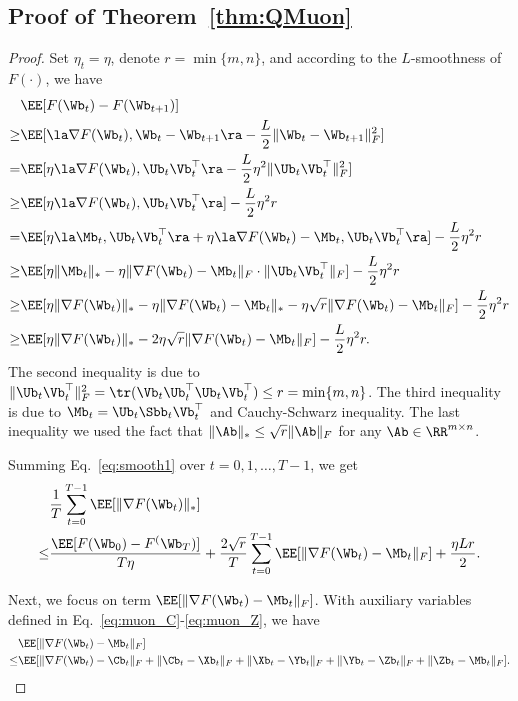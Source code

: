 \documentclass[11pt, letterpaper]{article}
\begin{document}
\subsection{Proof of Theorem~\ref{thm:QMuon}}
\begin{proof}
Set $\eta_t = \eta$, denote $r=\min\{m, n\}$, and according to the $L$-smoothness of $F(\cdot)$, we have
\begin{align}\label{eq:smooth1}
    &\EE[F(\Wb_t)-F(\Wb_{t+1})] \notag \\
    \ge& \EE[\la\nabla F(\Wb_t), \Wb_t - \Wb_{t+1} \ra-\frac{L}{2}\| \Wb_t - \Wb_{t+1} \|_F^2] \notag \\
    =& \EE[\eta \la\nabla F(\Wb_t), \Ub_t\Vb_t^{\top} \ra-\frac{L}{2}\eta^2\| \Ub_t\Vb_t^{\top} \|_F^2] \notag \\
    \ge& \EE[\eta \la\nabla F(\Wb_t), \Ub_t\Vb_t^{\top} \ra]-\frac{L}{2}\eta^2 r \notag \\
    =& \EE[\eta \la \Mb_t, \Ub_t\Vb_t^{\top} \ra + \eta\la\nabla F(\Wb_t) - \Mb_t, \Ub_t\Vb_t^{\top} \ra] -\frac{L}{2}\eta^2 r \notag \\
    \ge& \EE[\eta\|\Mb_t\|_* - \eta\|\nabla F(\Wb_t) - \Mb_t\|_F \cdot \|\Ub_t\Vb_t^{\top} \|_F] -\frac{L}{2}\eta^2 r \notag \\
    \ge& \EE[\eta\|\nabla F(\Wb_t)\|_* - \eta\|\nabla F(\Wb_t) - \Mb_t\|_* - \eta\sqrt{r}\|\nabla F(\Wb_t) - \Mb_t\|_F] -\frac{L}{2}\eta^2 r \notag \\
    \ge& \EE[\eta\|\nabla F(\Wb_t)\|_* - 2\eta\sqrt{r}\|\nabla F(\Wb_t) - \Mb_t\|_F] -\frac{L}{2}\eta^2 r.
\end{align}
The second inequality is due to $\|\Ub_t\Vb_t^{\top}\|_F^2 = \tr(\Vb_t\Ub_t^{\top}\Ub_t\Vb_t^{\top}) \le r=\min\{m,n\}$. The third inequality is due to $\Mb_t = \Ub_t\Sbb_t\Vb_t^{\top}$ and Cauchy-Schwarz inequality. The last inequality we used the fact that $\|\Ab\|_* \le \sqrt{r}\|\Ab\|_F$ for any $\Ab\in\RR^{m\times n}$.

Summing Eq.~\eqref{eq:smooth1} over $t=0,1,\ldots,T-1$, we get
\begin{align}\label{eq:muon_sum_smooth}
    &\frac{1}{T}\sum_{t=0}^{T-1}\EE[\|\nabla F(\Wb_t)\|_*] \notag \\
    \le& \frac{\EE[F(\Wb_0) - F^(\Wb_T)]}{T\eta} + \frac{2\sqrt{r}}{T}\sum_{t=0}^{T-1}\EE[\|\nabla F(\Wb_t) - \Mb_t\|_F] + \frac{\eta Lr}{2}.
\end{align}



Next, we focus on term $\EE[\|\nabla F(\Wb_t) - \Mb_t\|_F]$. With auxiliary variables defined in Eq.~\eqref{eq:muon_C}-\eqref{eq:muon_Z}, we have
\begin{align*}
    &\EE[\|\nabla F(\Wb_t) - \Mb_t\|_F] \\
    \le& \EE[\|\nabla F(\Wb_t) - \Cb_t\|_F + \|\Cb_t - \Xb_t\|_F + \|\Xb_t - \Yb_t\|_F + \|\Yb_t - \Zb_t\|_F + \|\Zb_t - \Mb_t\|_F].
\end{align*}


\end{proof}
\end{document}
